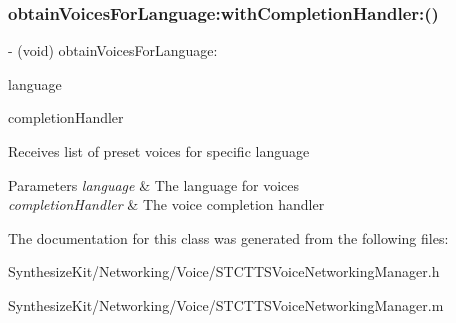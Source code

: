 \subsubsection{\texorpdfstring{obtain\+Voices\+For\+Language\+:with\+Completion\+Handler\+:()}{obtainVoicesForLanguage:withCompletionHandler:()}}
{\footnotesize\ttfamily -\/ (void) obtain\+Voices\+For\+Language\+: \begin{DoxyParamCaption}\item[{(N\+S\+String $\ast$)}]{language }\item[{withCompletionHandler:(Completion\+Handler)}]{completion\+Handler }\end{DoxyParamCaption}}

Receives list of preset voices for specific language 
\begin{DoxyParams}{Parameters}
{\em language} & The language for voices \\
\hline
{\em completion\+Handler} & The voice completion handler \\
\hline
\end{DoxyParams}


The documentation for this class was generated from the following files\+:\begin{DoxyCompactItemize}
\item 
Synthesize\+Kit/\+Networking/\+Voice/S\+T\+C\+T\+T\+S\+Voice\+Networking\+Manager.\+h\item 
Synthesize\+Kit/\+Networking/\+Voice/S\+T\+C\+T\+T\+S\+Voice\+Networking\+Manager.\+m\end{DoxyCompactItemize}
